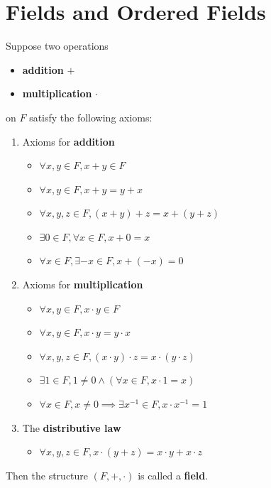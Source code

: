 \section{Fields and Ordered Fields} \label{an:sec:fields-and-ordered-fields}

\begin{definition} \label{an:def:field}
  Suppose two operations
  \begin{itemize}
    \item \textbf{addition} $+$
    \item \textbf{multiplication} $\cdot$
  \end{itemize}
  on $F$ satisfy the following axioms:
  \begin{enumerate}[label=\textbf{(\Alph*)}]
    \item Axioms for \textbf{addition}
          \begin{itemize}
            \item $\forall x, y \in F, x + y \in F$
            \item $\forall x, y \in F, x + y = y + x$
            \item $\forall x, y, z \in F, (x + y) + z = x + (y + z)$
            \item $\exists 0 \in F, \forall x \in F, x + 0 = x$
            \item $\forall x \in F, \exists -x \in F, x + (-x) = 0$
          \end{itemize}
    \item Axioms for \textbf{multiplication}
          \begin{itemize}
            \item $\forall x, y \in F, x \cdot y \in F$
            \item $\forall x, y \in F, x \cdot y = y \cdot x$
            \item $\forall x, y, z \in F, (x \cdot y) \cdot z = x \cdot (y \cdot z)$
            \item $\exists 1 \in F, 1 \neq 0 \land (\forall x \in F, x \cdot 1 = x)$
            \item $\forall x \in F, x \neq 0 \implies \exists x^{-1} \in F, x \cdot x^{-1} = 1$
          \end{itemize}
    \item The \textbf{distributive law}
          \begin{itemize}
            \item $\forall x, y, z \in F, x \cdot (y + z) = x \cdot y + x \cdot z$
          \end{itemize}
  \end{enumerate}
  Then the structure $(F, +, \cdot)$ is called a \textbf{field}.
\end{definition}

